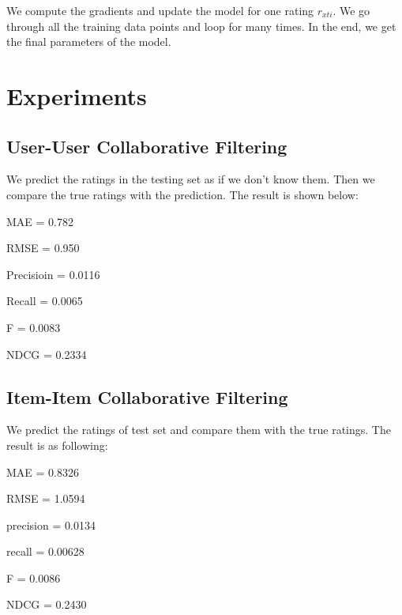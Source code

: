 \documentclass[sigconf]{acmart}
\begin{document}
{We compute the gradients and update the model for one rating $r_{xti}$. We go through all the training data points and loop for many times. In the end, we get the final parameters of the model.



}

\section{Experiments}\label{sec:experiments}
\subsection{User-User Collaborative Filtering}
\item{We predict the ratings in	the	testing	set	as if we don't know them. Then we compare the true ratings with the prediction. The result is shown below:}
\item{MAE = 0.782}
\item{RMSE = 0.950}
\item{Precisioin = 0.0116}
\item{Recall = 0.0065}
\item{F = 0.0083}
\item{NDCG = 0.2334}

\subsection{Item-Item Collaborative Filtering}
\item{We predict the ratings of test set and compare them with the true ratings. The result is as following:}
\item{MAE = 0.8326}
\item{RMSE = 1.0594}
\item{precision = 0.0134}
\item{recall = 0.00628}
\item{F = 0.0086}
\item{NDCG = 0.2430}
\end{document}
